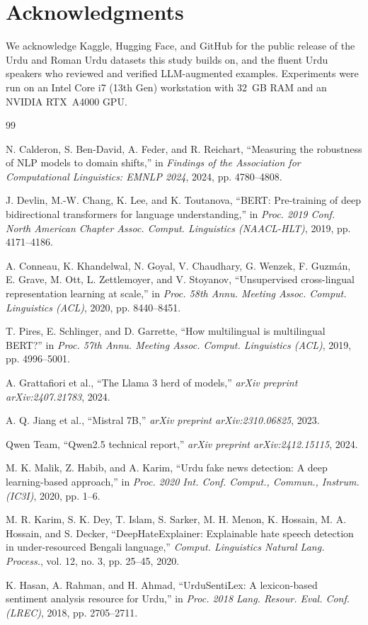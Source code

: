 \documentclass[10pt,twocolumn,journal]{IEEEtran}
\begin{document}
\section*{Acknowledgments}
We acknowledge Kaggle, Hugging Face, and GitHub for the public release of the Urdu and Roman Urdu datasets this study builds on, and the fluent Urdu speakers who reviewed and verified LLM-augmented examples. Experiments were run on an Intel Core i7 (13th Gen) workstation with 32~GB RAM and an NVIDIA RTX~A4000 GPU.

\begin{thebibliography}{99}

 N. Calderon, S. Ben-David, A. Feder, and R. Reichart, ``Measuring the robustness of NLP models to domain shifts,'' in \emph{Findings of the Association for Computational Linguistics: EMNLP 2024}, 2024, pp. 4780--4808.

 J. Devlin, M.-W. Chang, K. Lee, and K. Toutanova, ``BERT: Pre-training of deep bidirectional transformers for language understanding,'' in \emph{Proc. 2019 Conf. North American Chapter Assoc. Comput. Linguistics (NAACL-HLT)}, 2019, pp. 4171--4186.

 A. Conneau, K. Khandelwal, N. Goyal, V. Chaudhary, G. Wenzek, F. Guzm\'an, E. Grave, M. Ott, L. Zettlemoyer, and V. Stoyanov, ``Unsupervised cross-lingual representation learning at scale,'' in \emph{Proc. 58th Annu. Meeting Assoc. Comput. Linguistics (ACL)}, 2020, pp. 8440--8451.

 T. Pires, E. Schlinger, and D. Garrette, ``How multilingual is multilingual BERT?'' in \emph{Proc. 57th Annu. Meeting Assoc. Comput. Linguistics (ACL)}, 2019, pp. 4996--5001.

 A. Grattafiori et al., ``The Llama 3 herd of models,'' \emph{arXiv preprint arXiv:2407.21783}, 2024.

 A. Q. Jiang et al., ``Mistral 7B,'' \emph{arXiv preprint arXiv:2310.06825}, 2023.

 Qwen Team, ``Qwen2.5 technical report,'' \emph{arXiv preprint arXiv:2412.15115}, 2024.

 M. K. Malik, Z. Habib, and A. Karim, ``Urdu fake news detection: A deep learning-based approach,'' in \emph{Proc. 2020 Int. Conf. Comput., Commun., Instrum. (IC3I)}, 2020, pp. 1--6.

 M. R. Karim, S. K. Dey, T. Islam, S. Sarker, M. H. Menon, K. Hossain, M. A. Hossain, and S. Decker, ``DeepHateExplainer: Explainable hate speech detection in under-resourced Bengali language,'' \emph{Comput. Linguistics Natural Lang. Process.}, vol. 12, no. 3, pp. 25--45, 2020.

 K. Hasan, A. Rahman, and H. Ahmad, ``UrduSentiLex: A lexicon-based sentiment analysis resource for Urdu,'' in \emph{Proc. 2018 Lang. Resour. Eval. Conf. (LREC)}, 2018, pp. 2705--2711.

\end{thebibliography}
\end{document}

